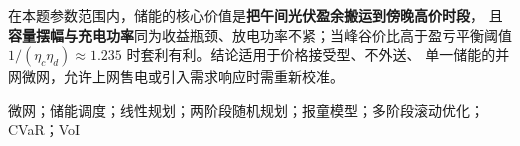 {%
在本题参数范围内，储能的核心价值是\textbf{把午间光伏盈余搬运到傍晚高价时段}，
且\textbf{容量摆幅与充电功率}同为收益瓶颈、放电功率不紧；当峰谷价比高于盈亏平衡阈值
\(1/(\eta_c\eta_d)\approx1.235\) 时套利有利。结论适用于价格接受型、不外送、
单一储能的并网微网，允许上网售电或引入需求响应时需重新校准。

\quad 微网；储能调度；线性规划；两阶段随机规划；报童模型；多阶段滚动优化；CVaR；VoI
}
\newpage

